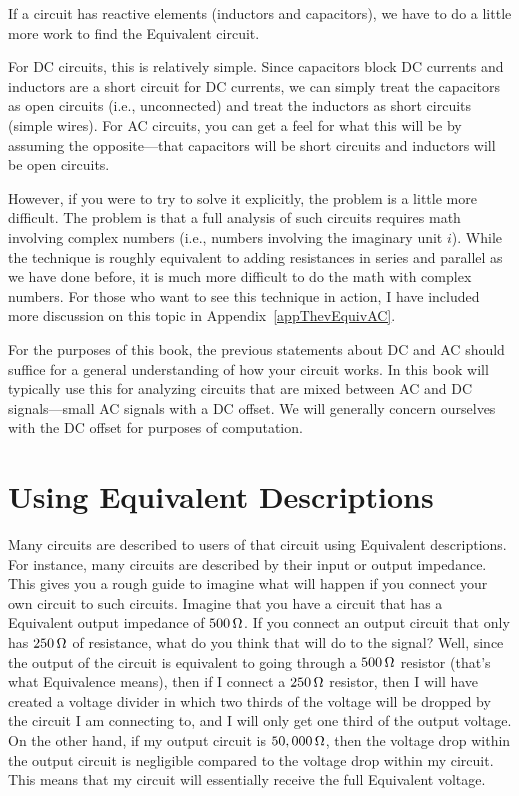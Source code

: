 If a circuit has reactive elements (inductors and capacitors), we have to do a little more work to find the \thev Equivalent circuit.

For DC circuits, this is relatively simple. 
Since capacitors block DC currents and inductors are a short circuit for DC currents, we can simply treat the capacitors as open circuits (i.e., unconnected) and treat the inductors as short circuits (simple wires).
For AC circuits, you can get a feel for what this will be by assuming the opposite---that capacitors will be short circuits and inductors will be open circuits.

However, if you were to try to solve it explicitly, the problem is a little more difficult.
The problem is that a full analysis of such circuits requires math involving complex numbers (i.e., numbers involving the imaginary unit $i$).  
While the technique is roughly equivalent to adding resistances in series and parallel as we have done before, it is much more difficult to do the math with complex numbers.
For those who want to see this technique in action, I have included more discussion on this topic in Appendix~\ref{appThevEquivAC}.

For the purposes of this book, the previous statements about DC and AC should suffice for a general understanding of how your circuit works.
In this book will typically use this for analyzing circuits that are mixed between AC and DC signals---small AC signals with a DC offset.
We will generally concern ourselves with the DC offset for purposes of computation.

\section{Using \thev Equivalent Descriptions}

Many circuits are described to users of that circuit using \thev Equivalent descriptions.
For instance, many circuits are described by their input or output impedance.
This gives you a rough guide to imagine what will happen if you connect your own circuit to such circuits.
Imagine that you have a circuit that has a \thev Equivalent output impedance of $500\,\si{\ohm}$.
If you connect an output circuit that only has $250\,\si{\ohm}$ of resistance, what do you think that will do to the signal?
Well, since the output of the circuit is equivalent to going through a $500\,\si{\ohm}$ resistor (that's what \thev Equivalence means), then if I connect a $250\,\si{\ohm}$ resistor, then I will have created a voltage divider in which two thirds of the voltage will be dropped by the circuit I am connecting to, and I will only get one third of the output voltage.
On the other hand, if my output circuit is $50,000\,\si{\ohm}$, then the voltage drop within the output circuit is negligible compared to the voltage drop within my circuit.
This means that my circuit will essentially receive the full \thev Equivalent voltage.

